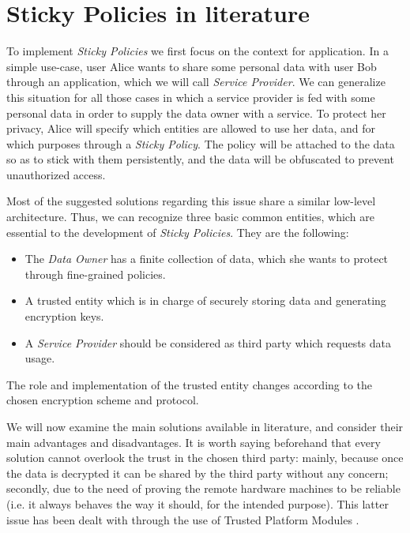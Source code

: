 \chapter{Sticky Policies in literature}
\label{chapter2}
\thispagestyle{empty}

To implement \textit{Sticky Policies} we first focus on the context for application. In a simple use-case, user Alice wants to share some personal data with user Bob through an application, which we will call \textit{Service Provider}. We can generalize this situation for all those cases in which a service provider is fed with some personal data in order to supply the data owner with a service. To protect her privacy, Alice will specify which entities are allowed to use her data, and for which purposes through a \textit{Sticky Policy}. The policy will be attached to the data so as to stick with them persistently, and the data will be obfuscated to prevent unauthorized access.

Most of the suggested solutions regarding this issue share a similar low-level architecture. Thus, we can recognize three basic common entities, which are essential to the development of \textit{Sticky Policies}. They are the following: 
 \begin{itemize}
 	\item The \textit{Data Owner} has a finite collection of data, which she wants to protect through fine-grained policies.
 	\item A trusted entity which is in charge of securely storing data and generating encryption keys.
 	\item A \textit{Service Provider} should be considered as third party which requests data usage.
 \end{itemize}
The role and implementation of the trusted entity changes according to the chosen encryption scheme and protocol.

We will now examine the main solutions available in literature, and consider their main advantages and disadvantages. It is worth saying beforehand that every solution cannot overlook the trust in the chosen third party: mainly, because once the data is decrypted it can be shared by the third party without any concern; secondly, due to the need of proving the remote hardware machines to be reliable (i.e. it always behaves the way it should, for the intended purpose). This latter issue has been dealt with through the use of Trusted Platform Modules \cite{standard2009trusted}.

